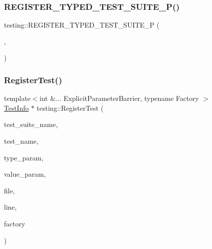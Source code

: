 \mbox{\label{namespacetesting_ac025be5150f4d250cfd8136063e2f2a1}} 
\subsubsection{\texorpdfstring{REGISTER\_TYPED\_TEST\_SUITE\_P()}{REGISTER\_TYPED\_TEST\_SUITE\_P()}}
{\footnotesize\ttfamily testing\+::\+R\+E\+G\+I\+S\+T\+E\+R\+\_\+\+T\+Y\+P\+E\+D\+\_\+\+T\+E\+S\+T\+\_\+\+S\+U\+I\+T\+E\+\_\+P (\begin{DoxyParamCaption}\item[{\mbox{\hyperlink{classtesting_1_1_code_location_for_t_y_p_e_d_t_e_s_t_p}{Code\+Location\+For\+T\+Y\+P\+E\+D\+T\+E\+S\+TP}}}]{,  }\item[{Verify}]{ }\end{DoxyParamCaption})}

\mbox{\label{namespacetesting_a8b90d759c019a155800afdd4b8d623c3}} 
\subsubsection{\texorpdfstring{RegisterTest()}{RegisterTest()}}
{\footnotesize\ttfamily template$<$int \&... Explicit\+Parameter\+Barrier, typename Factory $>$ \\
\mbox{\hyperlink{classtesting_1_1_test_info}{Test\+Info}} $\ast$ testing\+::\+Register\+Test (\begin{DoxyParamCaption}\item[{const char $\ast$}]{test\+\_\+suite\+\_\+name,  }\item[{const char $\ast$}]{test\+\_\+name,  }\item[{const char $\ast$}]{type\+\_\+param,  }\item[{const char $\ast$}]{value\+\_\+param,  }\item[{const char $\ast$}]{file,  }\item[{int}]{line,  }\item[{Factory}]{factory }\end{DoxyParamCaption})}

\mbox{\label{namespacetesting_adae3994eb444d1ad2dd602454b854663}} 
